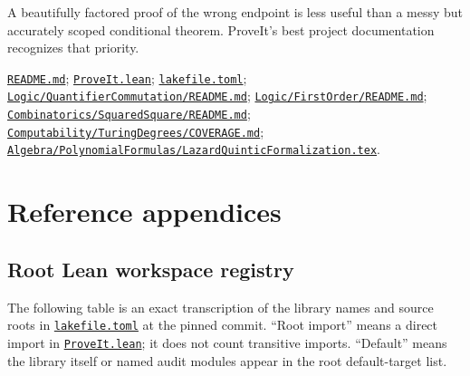 \documentclass[
  10pt,
  a4paper,
  twoside,
  open=any,
  parskip=half,
  headings=big
]{scrreprt}
\newcommand{\CommitFull}{675d0a2ff0fc624fba199e006049016ba806f40a}
\newcommand{\RepoBlobBase}{https://github.com/VladimirReshetnikov/ProveIt/blob/\CommitFull/}
\newcommand{\RepoFile}[1]{%
  \href{\RepoBlobBase\detokenize{#1}}{\nolinkurl{#1}}}
\begin{document}
A beautifully factored proof of the wrong endpoint is less useful than a
messy but accurately scoped conditional theorem.  ProveIt's best project
documentation recognizes that priority.

\begin{sourcebox}
\RepoFile{README.md};
\RepoFile{ProveIt.lean};
\RepoFile{lakefile.toml};
\RepoFile{Logic/QuantifierCommutation/README.md};
\RepoFile{Logic/FirstOrder/README.md};
\RepoFile{Combinatorics/SquaredSquare/README.md};
\RepoFile{Computability/TuringDegrees/COVERAGE.md};
\RepoFile{Algebra/PolynomialFormulas/LazardQuinticFormalization.tex}.
\end{sourcebox}

\appendix
\part{Reference appendices}

\chapter{Root Lean workspace registry}
\label{app:lake-registry}

The following table is an exact transcription of the library names and source
roots in \RepoFile{lakefile.toml} at the pinned commit.  ``Root import'' means
a direct import in \RepoFile{ProveIt.lean}; it does not count transitive
imports.  ``Default'' means the library itself or named audit modules appear in
the root default-target list.
\end{document}
